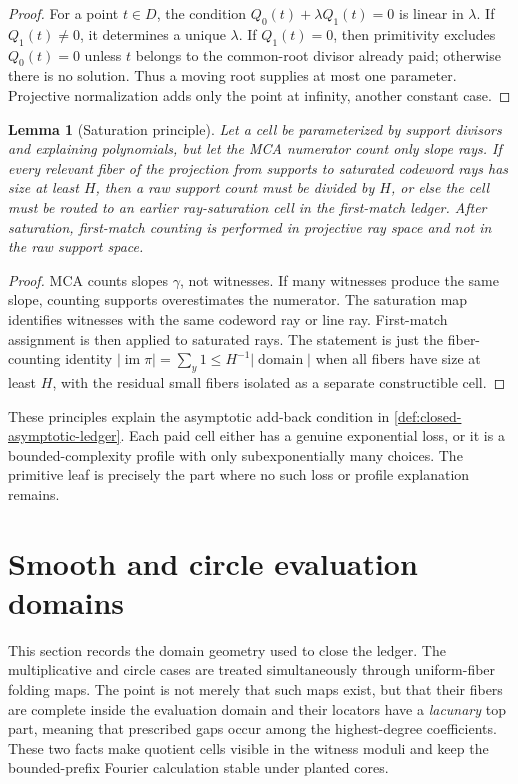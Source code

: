 \documentclass[12pt,a4paper]{amsart}
\numberwithin{equation}{section}
\newtheorem{lemma}[lemma]{Lemma}
\theoremstyle{remark}
\DeclareMathOperator{\im}{im}
\newcommand{\abs}[1]{\lvert #1\rvert}
\begin{document}
\begin{proof}
For a point \(t\in D\), the condition \(Q_0(t)+\lambda Q_1(t)=0\) is linear in \(\lambda\).  If \(Q_1(t)\ne0\), it determines a unique \(\lambda\).  If \(Q_1(t)=0\), then primitivity excludes \(Q_0(t)=0\) unless \(t\) belongs to the common-root divisor already paid; otherwise there is no solution.  Thus a moving root supplies at most one parameter.  Projective normalization adds only the point at infinity, another constant case.
\end{proof}

\begin{lemma}[Saturation principle]\label{lem:saturation-principle}
Let a cell be parameterized by support divisors and explaining polynomials,
but let the MCA numerator count only slope rays.  If every relevant fiber
of the projection from supports to saturated codeword rays has size at
least \(H\), then a raw support count must be divided by \(H\), or else
the cell must be routed to an earlier ray-saturation cell in the
first-match ledger.  After saturation, first-match counting is performed
in projective ray space and not in the raw support space.
\end{lemma}

\begin{proof}
MCA counts slopes \(\gamma\), not witnesses.  If many witnesses produce the same slope, counting supports overestimates the numerator.  The saturation map identifies witnesses with the same codeword ray or line ray.  First-match assignment is then applied to saturated rays.  The statement is just the fiber-counting identity \(\abs{\im \pi}=\sum_y1\le H^{-1}\abs{\operatorname{domain}}\) when all fibers have size at least \(H\), with the residual small fibers isolated as a separate constructible cell.
\end{proof}

These principles explain the asymptotic add-back condition in \cref{def:closed-asymptotic-ledger}.  Each paid cell either has a genuine exponential loss, or it is a bounded-complexity profile with only subexponentially many choices.  The primitive leaf is precisely the part where no such loss or profile explanation remains.


\section{Smooth and circle evaluation domains}\label{sec:smooth-circle-domains}

This section records the domain geometry used to close the ledger.  The
multiplicative and circle cases are treated simultaneously through
uniform-fiber folding maps.  The point is not merely that such maps exist,
but that their fibers are complete inside the evaluation domain and their
locators have a \emph{lacunary} top part, meaning that prescribed gaps occur
among the highest-degree coefficients.  These two facts make quotient
cells visible in the witness moduli and keep the bounded-prefix Fourier
calculation stable under planted cores.
\end{document}
